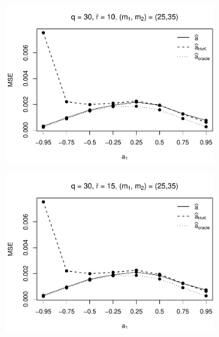 \begin{figure}[h!]
\begin{subfigure}[b]{0.45\textwidth}
\includegraphics[width=\textwidth]{Plots/Robustness/MSE_a1_T=500_slope=1_(q,r,M1,M2)=(30,10,25,35).pdf}
\end{subfigure}
\hspace{0.25cm}
\begin{subfigure}[b]{0.45\textwidth}
\includegraphics[width=\textwidth]{Plots/Robustness/MSE_a1_T=500_slope=1_(q,r,M1,M2)=(30,15,25,35).pdf}
\end{subfigure}


\end{figure}

